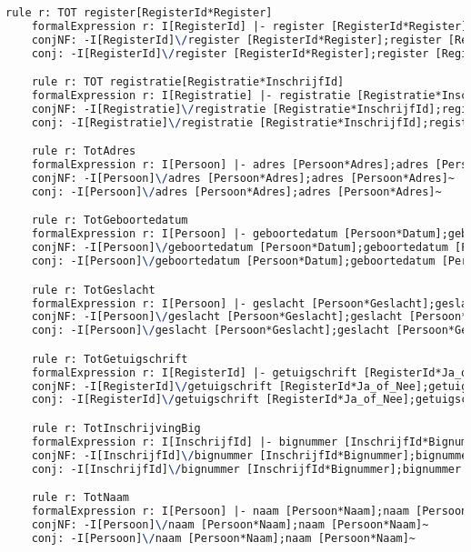 \begin{lstlisting}[language=TeX]
    rule r: TOT register[RegisterId*Register]
    formalExpression r: I[RegisterId] |- register [RegisterId*Register];register [RegisterId*Register]~
    conjNF: -I[RegisterId]\/register [RegisterId*Register];register [RegisterId*Register]~
    conj: -I[RegisterId]\/register [RegisterId*Register];register [RegisterId*Register]~

    rule r: TOT registratie[Registratie*InschrijfId]
    formalExpression r: I[Registratie] |- registratie [Registratie*InschrijfId];registratie [Registratie*InschrijfId]~
    conjNF: -I[Registratie]\/registratie [Registratie*InschrijfId];registratie [Registratie*InschrijfId]~
    conj: -I[Registratie]\/registratie [Registratie*InschrijfId];registratie [Registratie*InschrijfId]~

    rule r: TotAdres
    formalExpression r: I[Persoon] |- adres [Persoon*Adres];adres [Persoon*Adres]~
    conjNF: -I[Persoon]\/adres [Persoon*Adres];adres [Persoon*Adres]~
    conj: -I[Persoon]\/adres [Persoon*Adres];adres [Persoon*Adres]~

    rule r: TotGeboortedatum
    formalExpression r: I[Persoon] |- geboortedatum [Persoon*Datum];geboortedatum [Persoon*Datum]~
    conjNF: -I[Persoon]\/geboortedatum [Persoon*Datum];geboortedatum [Persoon*Datum]~
    conj: -I[Persoon]\/geboortedatum [Persoon*Datum];geboortedatum [Persoon*Datum]~

    rule r: TotGeslacht
    formalExpression r: I[Persoon] |- geslacht [Persoon*Geslacht];geslacht [Persoon*Geslacht]~
    conjNF: -I[Persoon]\/geslacht [Persoon*Geslacht];geslacht [Persoon*Geslacht]~
    conj: -I[Persoon]\/geslacht [Persoon*Geslacht];geslacht [Persoon*Geslacht]~

    rule r: TotGetuigschrift
    formalExpression r: I[RegisterId] |- getuigschrift [RegisterId*Ja_of_Nee];getuigschrift [RegisterId*Ja_of_Nee]~
    conjNF: -I[RegisterId]\/getuigschrift [RegisterId*Ja_of_Nee];getuigschrift [RegisterId*Ja_of_Nee]~
    conj: -I[RegisterId]\/getuigschrift [RegisterId*Ja_of_Nee];getuigschrift [RegisterId*Ja_of_Nee]~

    rule r: TotInschrijvingBig
    formalExpression r: I[InschrijfId] |- bignummer [InschrijfId*Bignummer];bignummer [InschrijfId*Bignummer]~
    conjNF: -I[InschrijfId]\/bignummer [InschrijfId*Bignummer];bignummer [InschrijfId*Bignummer]~
    conj: -I[InschrijfId]\/bignummer [InschrijfId*Bignummer];bignummer [InschrijfId*Bignummer]~

    rule r: TotNaam
    formalExpression r: I[Persoon] |- naam [Persoon*Naam];naam [Persoon*Naam]~
    conjNF: -I[Persoon]\/naam [Persoon*Naam];naam [Persoon*Naam]~
    conj: -I[Persoon]\/naam [Persoon*Naam];naam [Persoon*Naam]~


\end{lstlisting}
